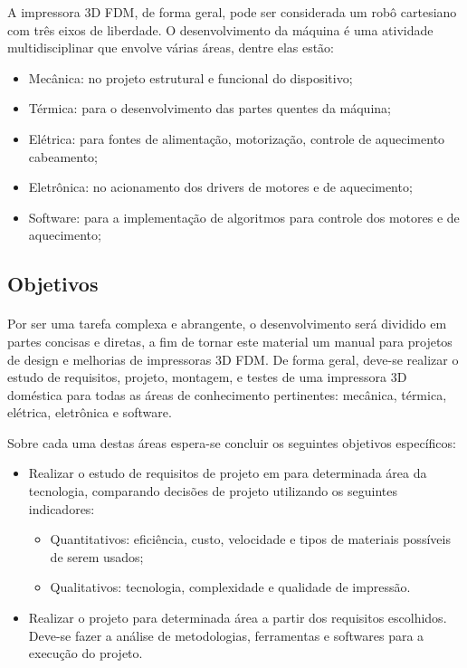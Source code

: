 \documentclass[12pt, english]{article}
\begin{document}
A impressora 3D FDM, de forma geral, pode ser considerada um robô cartesiano com três eixos de liberdade. O desenvolvimento da máquina é uma atividade multidisciplinar que envolve várias áreas, dentre elas estão:

\begin{itemize}
\item Mecânica: no projeto estrutural e funcional do dispositivo;
\item Térmica: para o desenvolvimento das partes quentes da máquina;
\item Elétrica: para fontes de alimentação, motorização, controle de aquecimento cabeamento;
\item Eletrônica: no acionamento dos drivers de motores e de aquecimento;
\item Software: para a implementação de algoritmos para controle dos motores e de aquecimento;
\end{itemize}

\subsection{Objetivos}

\paragraph{}
Por ser uma tarefa complexa e abrangente, o desenvolvimento será dividido em partes concisas e diretas, a fim de tornar este material um manual para projetos de design e melhorias de impressoras 3D FDM. De forma geral, deve-se realizar o estudo de requisitos, projeto, montagem, e testes de uma impressora 3D doméstica para todas as áreas de conhecimento pertinentes: mecânica, térmica, elétrica, eletrônica e software.

Sobre cada uma destas áreas espera-se concluir os seguintes objetivos específicos:

\begin{itemize}
\item Realizar o estudo de requisitos de projeto em para determinada área da tecnologia, comparando decisões de projeto utilizando os seguintes indicadores:
\begin{itemize}
	\item Quantitativos: eficiência, custo, velocidade e tipos de materiais possíveis de serem usados;
	\item Qualitativos: tecnologia, complexidade e qualidade de impressão.
\end{itemize}
\item Realizar o projeto para determinada área a partir dos requisitos escolhidos. Deve-se fazer a análise de metodologias, ferramentas e softwares para a execução do projeto.
\end{itemize}
\end{document}
